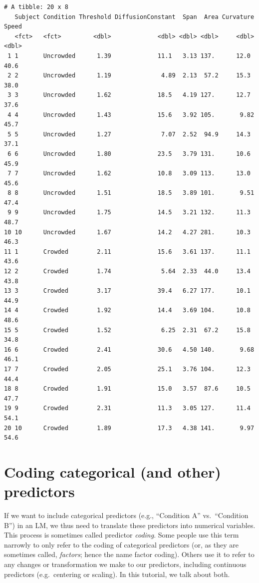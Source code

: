 \documentclass[
]{article}
\begin{document}
\footnotesize

\begin{verbatim}
# A tibble: 20 x 8
   Subject Condition Threshold DiffusionConstant  Span  Area Curvature Speed
   <fct>   <fct>         <dbl>             <dbl> <dbl> <dbl>     <dbl> <dbl>
 1 1       Uncrowded      1.39             11.1   3.13 137.      12.0   40.6
 2 2       Uncrowded      1.19              4.89  2.13  57.2     15.3   38.0
 3 3       Uncrowded      1.62             18.5   4.19 127.      12.7   37.6
 4 4       Uncrowded      1.43             15.6   3.92 105.       9.82  45.7
 5 5       Uncrowded      1.27              7.07  2.52  94.9     14.3   37.1
 6 6       Uncrowded      1.80             23.5   3.79 131.      10.6   45.9
 7 7       Uncrowded      1.62             10.8   3.09 113.      13.0   45.6
 8 8       Uncrowded      1.51             18.5   3.89 101.       9.51  47.4
 9 9       Uncrowded      1.75             14.5   3.21 132.      11.3   48.7
10 10      Uncrowded      1.67             14.2   4.27 281.      10.3   46.3
11 1       Crowded        2.11             15.6   3.61 137.      11.1   43.6
12 2       Crowded        1.74              5.64  2.33  44.0     13.4   43.8
13 3       Crowded        3.17             39.4   6.27 177.      10.1   44.9
14 4       Crowded        1.92             14.4   3.69 104.      10.8   48.6
15 5       Crowded        1.52              6.25  2.31  67.2     15.8   34.8
16 6       Crowded        2.41             30.6   4.50 140.       9.68  46.1
17 7       Crowded        2.05             25.1   3.76 104.      12.3   44.4
18 8       Crowded        1.91             15.0   3.57  87.6     10.5   47.7
19 9       Crowded        2.31             11.3   3.05 127.      11.4   54.1
20 10      Crowded        1.89             17.3   4.38 141.       9.97  54.6
\end{verbatim}

\normalsize

\hypertarget{coding-categorical-and-other-predictors}{%
\section{Coding categorical (and other)
predictors}\label{coding-categorical-and-other-predictors}}

If we want to include categorical predictors (e.g., ``Condition A''
vs.~``Condition B'') in an LM, we thus need to translate these
predictors into numerical variables. This process is sometimes called
predictor \emph{coding}. Some people use this term narrowly to only
refer to the coding of categorical predictors (or, as they are sometimes
called, \emph{factors}; hence the name factor coding). Others use it to
refer to any changes or transformation we make to our predictors,
including continuous predictors (e.g.~centering or scaling). In this
tutorial, we talk about both.
\end{document}
